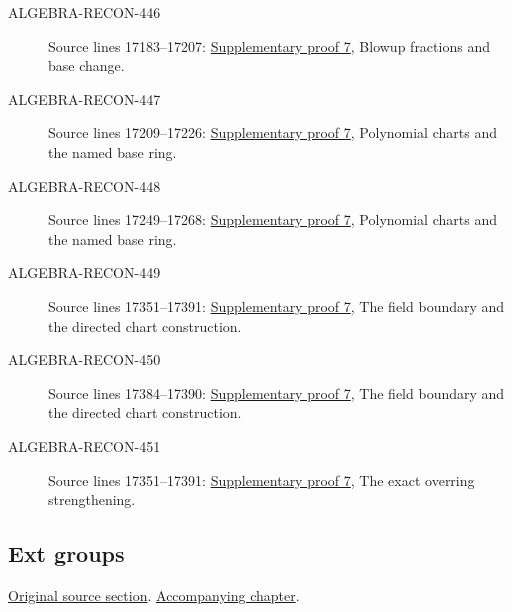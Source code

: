 \begin{description}
\item[ALGEBRA-RECON-446] Source lines 17183--17207: \hyperlink{algebra_blowup_ext_depth_notes_20260927}{Supplementary proof 7}, Blowup fractions and base change.
\item[ALGEBRA-RECON-447] Source lines 17209--17226: \hyperlink{algebra_blowup_ext_depth_notes_20260927}{Supplementary proof 7}, Polynomial charts and the named base ring.
\item[ALGEBRA-RECON-448] Source lines 17249--17268: \hyperlink{algebra_blowup_ext_depth_notes_20260927}{Supplementary proof 7}, Polynomial charts and the named base ring.
\item[ALGEBRA-RECON-449] Source lines 17351--17391: \hyperlink{algebra_blowup_ext_depth_notes_20260927}{Supplementary proof 7}, The field boundary and the directed chart construction.
\item[ALGEBRA-RECON-450] Source lines 17384--17390: \hyperlink{algebra_blowup_ext_depth_notes_20260927}{Supplementary proof 7}, The field boundary and the directed chart construction.
\item[ALGEBRA-RECON-451] Source lines 17351--17391: \hyperlink{algebra_blowup_ext_depth_notes_20260927}{Supplementary proof 7}, The exact overring strengthening.
\end{description}

\subsection{Ext groups}
\hypertarget{algebra-source-section-ext}{}
\noindent\href{https://github.com/stacks/stacks-project/blob/a04446e57ec1fbc252a871afcec7752fb2807b14/algebra.tex\#L17402}{Original source section}. \href{algebra.pdf\#nameddest=section-ext}{Accompanying chapter}.

